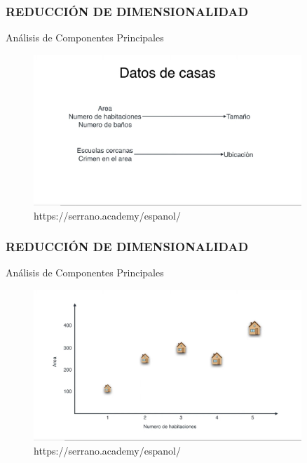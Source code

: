 \documentclass{beamer}
\begin{document}
\begin{frame}
	\frametitle{REDUCCIÓN DE DIMENSIONALIDAD}
	\begin{block}{Análisis de Componentes Principales}	
		\begin{figure}
			\includegraphics[width=0.9\textwidth]{PCA/IMG_3536.jpg}
			\caption{https://serrano.academy/espanol/}
		\end{figure}
	\end{block}
\end{frame}

\begin{frame}
	\frametitle{REDUCCIÓN DE DIMENSIONALIDAD}
	\begin{block}{Análisis de Componentes Principales}	
		\begin{figure}
			\includegraphics[width=0.9\textwidth]{PCA/IMG_3537.jpg}
			\caption{https://serrano.academy/espanol/}
		\end{figure}
	\end{block}
\end{frame}
\end{document}
